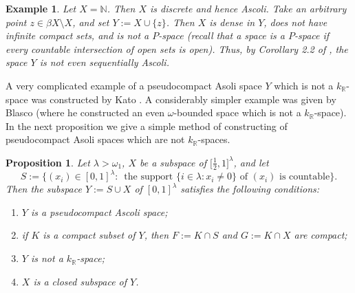 \documentclass[preprint,11pt]{elsarticle}
\newtheorem{proposition}[theorem]{Proposition}
\newtheorem{example}[theorem]{Example}
\numberwithin{equation}{section}
\numberwithin{theorem}{section}
\newcommand{\w}{\omega}
\newcommand{\NN}{\mathbb{N}}
\newcommand{\IR}{\mathbb{R}}
\newcommand{\SM}{{\setminus}}
\begin{document}
\begin{example} {\em
Let $X=\NN$. Then $X$ is discrete and hence Ascoli. Take an arbitrary point $z\in\beta X\SM X$, and set $Y:=X\cup\{z\}$. Then $X$ is dense in $Y$, does not have infinite compact sets, and  is not a $P$-space (recall that a space  is a {\em $P$-space} if every countable intersection of open sets is open).  Thus, by Corollary 2.2 of \cite{Gabr-lc-Ck}, the space $Y$ is not even sequentially Ascoli.} %
\end{example}




A very complicated example of a pseudocompact Asoli space $Y$ which is not a $k_\IR$-space was constructed by Kato \cite{Kato}. A considerably simpler example was given by Blasco \cite{Blasco-78} (where he constructed an even $\w$-bounded space which is not a $k_\IR$-space). In the next proposition we give a simple method of constructing of pseudocompact Asoli spaces which are not $k_\IR$-spaces.

\begin{proposition} \label{p:Ascoli-non-kR-pseudocompact}
Let $\lambda>\w_1$, $X$ be a subspace of $\big[\tfrac{1}{2},1\big]^\lambda$, and let
\[
S:= \big\{ (x_i)\in [0,1]^\lambda: \, \mbox{ the support } \{i\in \lambda: x_i\not=0\} \mbox{ of } (x_i) \mbox{ is countable}\big\}.
\]
Then the subspace $Y:=S\cup X$ of $[0,1]^\lambda$ satisfies the following conditions:
\begin{enumerate}
\item[{\rm(i)}] $Y$ is a pseudocompact Ascoli space;
\item[{\rm(ii)}] if $K$ is a compact subset of $Y$, then $F:=K\cap S$ and $G:=K\cap X$ are compact;
\item[{\rm(iii)}] $Y$ is not a $k_\IR$-space;
\item[{\rm(iv)}] $X$ is a closed subspace of $Y$.
\end{enumerate}
\end{proposition}
\end{document}
